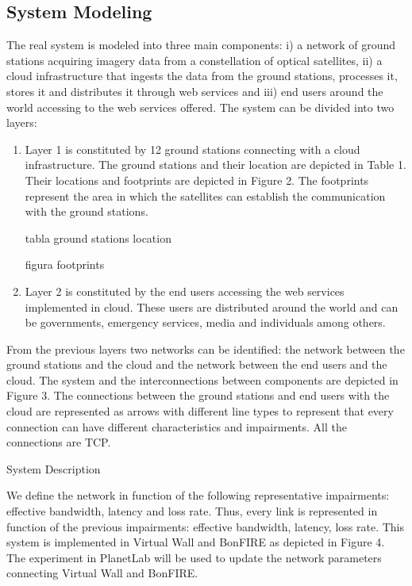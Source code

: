 \subsection{System Modeling}

The real system is modeled into three main components: i) a network of ground stations acquiring imagery data from a constellation of optical satellites, ii) a cloud infrastructure that ingests the data from the ground stations, processes it, stores it and distributes it through web services and iii) end users around the world accessing to the web services offered. The system can be divided into two layers: 

\begin{enumerate}

\item Layer 1 is constituted by 12 ground stations connecting with a cloud infrastructure. The ground stations and their location are depicted in Table 1. Their locations and footprints are depicted in Figure 2. The footprints represent the area in which the satellites can establish the communication with the ground stations.

tabla ground stations location

figura footprints

\item Layer 2 is constituted by the end users accessing the web services
  implemented in cloud. These users are distributed around the world and can be
  governments, emergency services, media and individuals among others.
\end{enumerate}

From the previous layers two networks can be identified: the network between the
ground stations and the cloud and the network between the end users and the
cloud. The system and the interconnections between components are depicted in
Figure 3. The connections between the ground stations and end users with the
cloud are represented as arrows with different line types to represent that
every connection can have different characteristics and impairments. All the
connections are TCP.

System Description


We define the network in function of the following representative impairments: effective bandwidth, latency and loss rate. Thus, every link is represented in function of the previous impairments: effective bandwidth, latency, loss rate.
This system is implemented in Virtual Wall and BonFIRE as depicted in Figure 4. The experiment in PlanetLab will be used to update the network parameters connecting Virtual Wall and BonFIRE.

